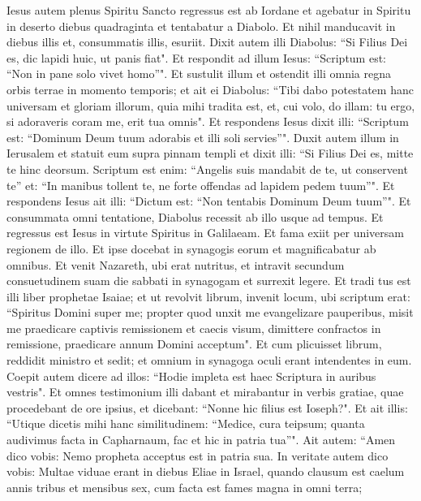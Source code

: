 \begin{biblechapter}  
\verse Iesus autem plenus Spiritu Sancto regressus est ab Iordane et agebatur in Spiritu in deserto 
\verse diebus quadraginta et tentabatur a Diabolo. Et nihil manducavit in diebus illis et, consummatis illis, esuriit. 
\verse Dixit autem illi Diabolus: “Si Filius Dei es, dic lapidi huic, ut panis fiat". 
\verse Et respondit ad illum Iesus: “Scriptum est: “Non in pane solo vivet homo”". 
\verse Et sustulit illum et ostendit illi omnia regna orbis terrae in momento temporis;  
\verse et ait ei Diabolus: “Tibi dabo potestatem hanc universam et gloriam illorum, quia mihi tradita est, et, cui volo, do illam: 
\verse tu ergo, si adoraveris coram me, erit tua omnis". 
\verse Et respondens Iesus dixit illi: “Scriptum est: “Dominum Deum tuum adorabis et illi soli servies”". 
\verse Duxit autem illum in Ierusalem et statuit eum supra pinnam templi et dixit illi: “Si Filius Dei es, mitte te hinc deorsum. 
\verse Scriptum est enim: “Angelis suis mandabit de te, ut conservent te” 
\verse et: “In manibus tollent te, ne forte offendas ad lapidem pedem tuum”". 
\verse Et respondens Iesus ait illi: “Dictum est: “Non tentabis Dominum Deum tuum”". 
\verse Et consummata omni tentatione, Diabolus recessit ab illo usque ad tempus. 
\verse Et regressus est Iesus in virtute Spiritus in Galilaeam. Et fama exiit per universam regionem de illo. 
\verse Et ipse docebat in synagogis eorum et magnificabatur ab omnibus. 
\verse Et venit Nazareth, ubi erat nutritus, et intravit secundum consuetudinem suam die sabbati in synagogam et surrexit legere. 
\verse Et tradi tus est illi liber prophetae Isaiae; et ut revolvit librum, invenit locum, ubi scriptum erat: 
\verse “Spiritus Domini super me; propter quod unxit me evangelizare pauperibus, misit me praedicare captivis remissionem et caecis visum, dimittere confractos in remissione, 
\verse praedicare annum Domini acceptum". 
\verse Et cum plicuisset librum, reddidit ministro et sedit; et omnium in synagoga oculi erant intendentes in eum. 
\verse Coepit autem dicere ad illos: “Hodie impleta est haec Scriptura in auribus vestris". 
\verse Et omnes testimonium illi dabant et mirabantur in verbis gratiae, quae procedebant de ore ipsius, et dicebant: “Nonne hic filius est Ioseph?". 
\verse Et ait illis: “Utique dicetis mihi hanc similitudinem: “Medice, cura teipsum; quanta audivimus facta in Capharnaum, fac et hic in patria tua”". 
\verse Ait autem: “Amen dico vobis: Nemo propheta acceptus est in patria sua. 
\verse In veritate autem dico vobis: Multae viduae erant in diebus Eliae in Israel, quando clausum est caelum annis tribus et mensibus sex, cum facta est fames magna in omni terra; 

\end{biblechapter}
